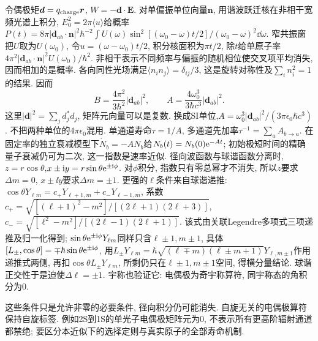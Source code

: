 令偶极矩$\boldsymbol d=q_{\rm charge}\boldsymbol r$, $W=-\boldsymbol d\cdot\boldsymbol E$. 对单偏振单位向量$\boldsymbol n$, 用谐波跃迁核在非相干宽频光谱上积分, $E_0^2=2\pi\langle u\rangle$给概率$P(t)=8\pi|\boldsymbol d_{ab}\cdot\boldsymbol n|^2\hbar^{-2}\int U(\omega)\sin^2[(\omega_0-\omega)t/2]/(\omega_0-\omega)^2\dd\omega$. 窄共振窗把$U$取为$U(\omega_0)$, 令$u=(\omega-\omega_0)t/2$, 积分核面积为$\pi t/2$, 除$t$给单原子率$4\pi^2|\boldsymbol d_{ab}\cdot\boldsymbol n|^2U(\omega_0)/\hbar^2$. 非相干表示不同频率与偏振的随机相位使交叉项平均消失, 因而相加的是概率. 各向同性光场满足$\langle n_in_j\rangle=\delta_{ij}/3$, 这是旋转对称性及$\sum_i n_i^2=1$的结果. 因而
\[
B=\frac{4\pi^2}{3\hbar^2}|\boldsymbol d_{ab}|^2,\qquad
A=\frac{4\omega_0^3}{3\hbar c^3}|\boldsymbol d_{ab}|^2.
\]
这里$|\boldsymbol d|^2=\sum_jd_j^*d_j$, 矩阵元向量可以是复数. 换成SI单位,$A=\omega_0^3|\boldsymbol d_{ab}|^2/(3\pi\epsilon_0\hbar c^3)$. 不把两种单位的$4\pi\epsilon_0$混用. 单通道寿命$\tau=1/A$, 多通道先加率$\tau^{-1}=\sum_aA_{b\to a}$. 在固定率的独立衰减模型下$\dot N_b=-AN_b$给$N_b(t)=N_b(0)\mathrm e^{-At}$; 初始极短时间的精确量子衰减仍可为二次, 这一指数是速率近似.
径向波函数与球谐函数分离时,$z=r\cos\theta$,$x\pm\mathrm i y=r\sin\theta\mathrm e^{\pm\mathrm i\phi}$. 对$\phi$积分, 指数只有零总幂才不消失, 所以$z$要求$\Delta m=0$, $x\pm\ii y$要求$\Delta m=\pm1$. 更强的$\ell$条件来自球谐递推: $\cos\theta Y_{\ell m}=c_+Y_{\ell+1,m}+c_-Y_{\ell-1,m}$, 系数$c_+=\sqrt{[(\ell+1)^2-m^2]/[(2\ell+1)(2\ell+3)]}$, $c_-=\sqrt{[\ell^2-m^2]/[(2\ell-1)(2\ell+1)]}$. 该式由关联Legendre多项式三项递推及归一化得到; $\sin\theta\mathrm e^{\pm\mathrm i\phi}Y_{\ell m}$同样只含$\ell\pm1,m\pm1$, 具体$[L_\pm,\cos\theta]=\mp\hbar\sin\theta\mathrm e^{\pm\mathrm i\phi}$, 用$L_\pm Y_{\ell m}=\hbar\sqrt{(\ell\mp m)(\ell\pm m+1)}Y_{\ell,m\pm1}$作用递推式两侧, 再扣$\cos\theta L_\pm Y_{\ell m}$, 所剩仍只在$\ell\pm1,m\pm1$空间, 得横分量结论. 球谐正交性于是迫使$\Delta\ell=\pm1$. 宇称也验证它: 电偶极为奇宇称算符, 同宇称态的角积分为0.

这些条件只是允许非零的必要条件, 径向积分仍可能消失. 自旋无关的电偶极算符保持自旋标签. 例如2S到1S的单光子电偶极矩阵元为0, 不表示所有更高阶辐射通道都禁绝; 要区分本近似下的选择定则与真实原子的全部寿命机制.

